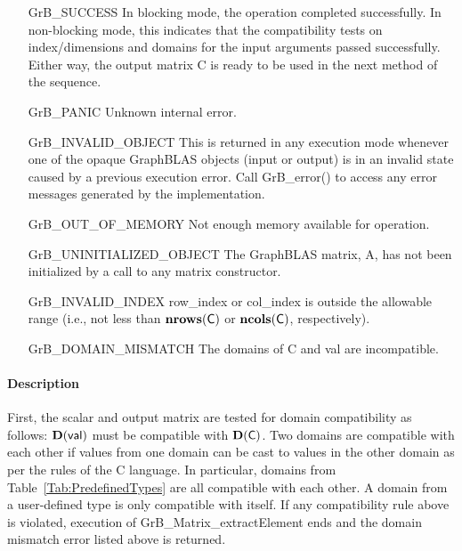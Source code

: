 \begin{itemize}[leftmargin=2.1in]
    \item[{\sf GrB\_SUCCESS}]         In blocking mode, the operation completed
    successfully. In non-blocking mode, this indicates that the compatibility 
    tests on index/dimensions and domains for the input arguments passed successfully. 
    Either way, the output matrix {\sf C} is ready to be used in the next method of 
    the sequence.

    \item[{\sf GrB\_PANIC}]   Unknown internal error.
    
    \item[{\sf GrB\_INVALID\_OBJECT}] This is returned in any execution mode 
    whenever one of the opaque GraphBLAS objects (input or output) is in an invalid 
    state caused by a previous execution error.  Call {\sf GrB\_error()} to access 
    any error messages generated by the implementation.

    \item[{\sf GrB\_OUT\_OF\_MEMORY}]  Not enough memory available for operation.
    
    \item[{\sf GrB\_UNINITIALIZED\_OBJECT}]  The GraphBLAS matrix, {\sf A}, has 
    not been initialized by a call to any matrix constructor.

    \item[{\sf GrB\_INVALID\_INDEX}]  {\sf row\_index} or {\sf col\_index} is 
    outside the allowable range (i.e., not less than $\mathbf{nrows}({\sf C})$ or
    $\mathbf{ncols}({\sf C})$, respectively).

    \item[{\sf GrB\_DOMAIN\_MISMATCH}]     The domains of {\sf C} and {\sf val}
    are incompatible.
\end{itemize}

\paragraph{Description}

First, the scalar and output matrix are tested for domain compatibility as follows:  
$\mathbf{D}({\sf val})$ must be compatible with $\mathbf{D}({\sf C})$. Two domains 
are compatible with each other if values from one domain can be cast to values 
in the other domain as per the rules of the C language.  In particular, domains 
from Table~\ref{Tab:PredefinedTypes} are all compatible with each other. A domain 
from a user-defined type is only compatible with itself.  If any compatibility 
rule above is violated, execution of {\sf GrB\_Matrix\_extractElement} ends and
the domain mismatch error listed above is returned.

